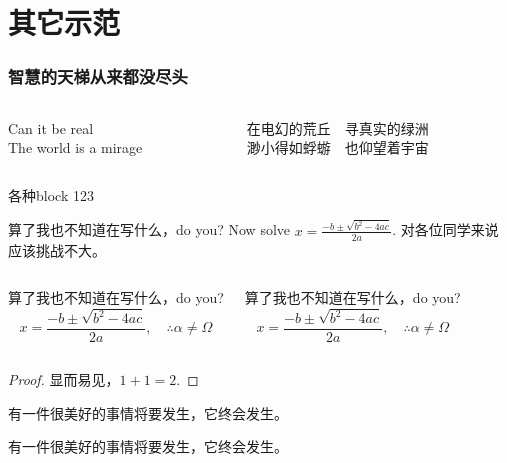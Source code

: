 \documentclass[aspectratio=1610,linespread=1.4,t]{ctexbeamer}
\begin{document}
\section{其它示范}

\begin{frame}[c]
\frametitle{智慧的天梯从来都没尽头}
\begin{columns}
\begin{column}{.4\textwidth}
\begin{pullquote}
    Can it be real\\
    The world is a mirage
\end{pullquote}
\end{column}

\begin{column}{.53\textwidth}
\renewcommand{\MiragePullquoteOpen}{\hskip-.2\ccwd『}
\begin{pullquote}
在电幻的荒丘　寻真实的绿洲\\
渺小得如蜉蝣　也仰望着宇宙
\end{pullquote}
\end{column}
\end{columns}
\end{frame}



\begin{frame}[allowframebreaks]{各种block 123}
    
    \begin{exampleblock}{算了我也不知道在写什么，do you?}
    Now solve $x = \frac{-b \pm \sqrt{b^2 -4ac}}{2a}$. 对各位同学来说应该挑战不大。
    \end{exampleblock}

\begin{columns}[T]
    \begin{alertblock}{算了我也不知道在写什么，do you?}
    \[ x = \frac{-b \pm \sqrt{b^2 -4ac}}{2a}, \quad\therefore \alpha \neq \Omega \]
    \end{alertblock}
    
    \begin{block}{算了我也不知道在写什么，do you?}
    \[ x = \frac{-b \pm \sqrt{b^2 -4ac}}{2a}, \quad\therefore \alpha \neq \Omega \]
    \end{block}
\end{columns}
    
    \begin{proof}
    显而易见，$1+1=2$.
    \end{proof}

    \begin{theorem}
    有一件很美好的事情将要发生，它终会发生。
    \end{theorem}
    
    \begin{definition}
    有一件很美好的事情将要发生，它终会发生。
    \end{definition}
\end{frame}
\end{document}
